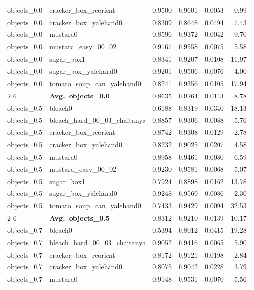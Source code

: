 \begin{longtable}{llrrrr}
  objects_0.0 & cracker\_box\_reorient & 0.9500 & 0.9601 & 0.0053 & 0.99 \\
  objects_0.0 & cracker\_box\_yalehand0 & 0.8309 & 0.8648 & 0.0494 & 7.43 \\
  objects_0.0 & mustard0 & 0.8596 & 0.9372 & 0.0042 & 9.70 \\
  objects_0.0 & mustard\_easy\_00\_02 & 0.9167 & 0.9558 & 0.0075 & 5.58 \\
  objects_0.0 & sugar\_box1 & 0.8341 & 0.9207 & 0.0108 & 11.97 \\
  objects_0.0 & sugar\_box\_yalehand0 & 0.9201 & 0.9506 & 0.0076 & 4.00 \\
  objects_0.0 & tomato\_soup\_can\_yalehand0 & 0.8241 & 0.9356 & 0.0105 & 17.94 \\
  \cmidrule{2-6}
  & \textbf{Avg.~objects_0.0} & 0.8635 & 0.9264 & 0.0143 & 8.78 \\
  \midrule
  objects_0.5 & bleach0 & 0.6188 & 0.8319 & 0.0340 & 18.13 \\
  objects_0.5 & bleach\_hard\_00\_03\_chaitanya & 0.8857 & 0.9306 & 0.0088 & 5.76 \\
  objects_0.5 & cracker\_box\_reorient & 0.8742 & 0.9308 & 0.0129 & 2.78 \\
  objects_0.5 & cracker\_box\_yalehand0 & 0.8232 & 0.9025 & 0.0207 & 4.58 \\
  objects_0.5 & mustard0 & 0.8958 & 0.9461 & 0.0080 & 6.59 \\
  objects_0.5 & mustard\_easy\_00\_02 & 0.9230 & 0.9581 & 0.0068 & 5.07 \\
  objects_0.5 & sugar\_box1 & 0.7924 & 0.8898 & 0.0162 & 13.78 \\
  objects_0.5 & sugar\_box\_yalehand0 & 0.9248 & 0.9560 & 0.0086 & 2.30 \\
  objects_0.5 & tomato\_soup\_can\_yalehand0 & 0.7433 & 0.9429 & 0.0094 & 32.53 \\
  \cmidrule{2-6}
  & \textbf{Avg.~objects_0.5} & 0.8312 & 0.9210 & 0.0139 & 10.17 \\
  \midrule
  objects_0.7 & bleach0 & 0.5394 & 0.8012 & 0.0415 & 19.28 \\
  objects_0.7 & bleach\_hard\_00\_03\_chaitanya & 0.9052 & 0.9416 & 0.0065 & 5.90 \\
  objects_0.7 & cracker\_box\_reorient & 0.8172 & 0.9121 & 0.0198 & 2.84 \\
  objects_0.7 & cracker\_box\_yalehand0 & 0.8075 & 0.9042 & 0.0228 & 3.79 \\
  objects_0.7 & mustard0 & 0.9148 & 0.9531 & 0.0070 & 5.56 \\

\end{longtable}
